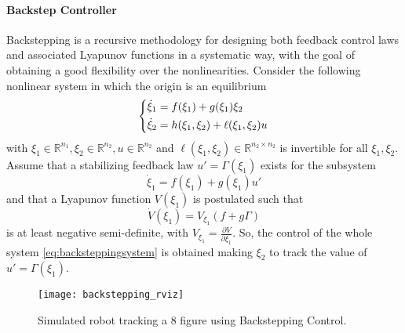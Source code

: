 \paragraph{Backstep Controller}
Backstepping is a recursive methodology for designing both feedback control laws and associated Lyapunov functions in a systematic way, with the goal of obtaining a good flexibility over the nonlinearities. Consider the following nonlinear system in which the origin is an equilibrium
\begin{equation}
\begin{dcases}
\dot{\xi}_1 = f(\xi_1) + g(\xi_1)\xi_2 \\
\dot{\xi}_2 = h(\xi_1,\xi_2) + \ell(\xi_1,\xi_2)u
\end{dcases}
\label{eq:backsteppingsystem}
\end{equation}
with $\xi_1\in\mathbb{R}^{n_1}, \xi_2\in\mathbb{R}^{n_2},u\in\mathbb{R}^{n_2}$ and $\ell(\xi_1,\xi_2)\in\mathbb{R}^{n_2 \times n_2}$ is invertible for all $\xi_1,\xi_2$. Assume that a stabilizing feedback law $u'=\Gamma(\xi_1)$ exists for the subsystem 
\begin{equation}
\dot{\xi}_1 = f(\xi_1) + g(\xi_1)u'
\end{equation}
and that a Lyapunov function $V(\xi_1)$ is postulated such that
\begin{equation}
\dot{V}(\xi_1) = V_{\xi_1}(f + g\Gamma)
\end{equation}
is at least negative semi-definite, with $V_{\xi_1} = \frac{\partial{V}}{\partial{\xi_1}}$. So, the control of the whole system \eqref{eq:backsteppingsystem} is obtained making $\xi_2$ to track the value of $u'=\Gamma(\xi_1)$.

\begin{figure}[H]
	\centering
	\texttt{[image: backstepping\_rviz]}
	\caption{Simulated robot tracking a 8 figure using Backstepping Control.}
\end{figure}

